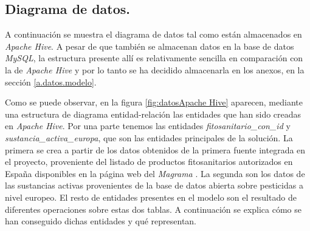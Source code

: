 \subsection{Diagrama de datos.} \label{disenyo.arquitectura.datos}
\par A continuación se muestra el diagrama de datos tal como están almacenados en \textit{Apache Hive}. A pesar de que también se almacenan datos en la base de datos \textit{MySQL}, la estructura presente allí es relativamente sencilla en comparación con la de \textit{Apache Hive} y por lo tanto se ha decidido almacenarla en los anexos, en la sección \ref{a.datos.modelo}. 
\par 
Como se puede observar, en la figura \ref{fig:datosApache Hive} aparecen, mediante una estructura de diagrama entidad-relación las entidades que han sido creadas en \textit{Apache Hive}. Por una parte tenemos las entidades \textit{fitosanitario\_con\_id} y \textit{sustancia\_activa\_europa}, que son las entidades principales de la solución. La primera se crea a partir de los datos obtenidos de la primera fuente integrada en el proyecto, proveniente del listado de productos fitosanitarios autorizados en España disponibles en la página web del \textit{Magrama} \cite{mapama}. La segunda son los datos de las sustancias activas provenientes de la base de datos abierta sobre pesticidas a nivel europeo. El resto de entidades presentes en el modelo son el resultado de diferentes operaciones sobre estas dos tablas. A continuación se explica cómo se han conseguido dichas entidades y qué representan. 
